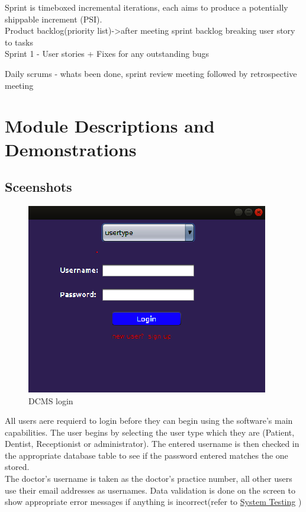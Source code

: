 \documentclass[11 pt]{article}
\begin{document}
Sprint is timeboxed incremental iterations, each aims to produce a potentially shippable increment (PSI).\\
Product backlog(priority list)->after meeting sprint backlog breaking user story to tasks \\
Sprint 1 - User stories + Fixes for any outstanding bugs

Daily scrums - whats been done, sprint review meeting
followed by retrospective meeting
\clearpage
\section{Module Descriptions and Demonstrations} 
\subsection{Sceenshots}
\begin{figure}[h]
    \centering 
    \includegraphics[width=0.7\linewidth]{login.png}
    \caption{DCMS login}
    \label{fig:login}
    \end{figure}
All users aere requierd to login before they can begin using the software's main capabilities. The user begins by selecting the user type which they are (Patient, Dentist, Receptionist or administrator). The entered username is then checked in the appropriate database table to see if the password entered matches the one stored. \\
The doctor's username is taken as the doctor's practice number, all other users use their email addresses as usernames.
Data validation is done on the screen to show appropriate error messages if anything is incorrect(refer to 
\hyperref[sec:system_testing]{System Testing} )
\end{document}
